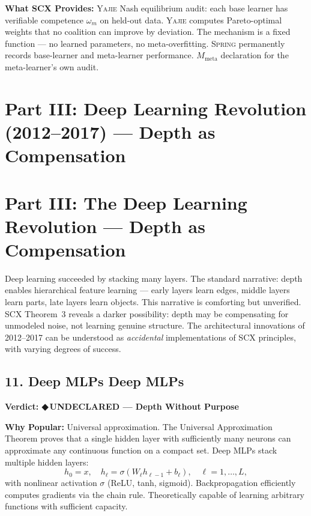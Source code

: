 \documentclass[12pt,a4paper]{article}
\theoremstyle{definition}
\newcommand{\guilty}{{\color{guiltycolor}\textbf{◆\,UNDECLARED}}}
\newcommand{\Yajie}{\textsc{Yajie}}
\newcommand{\Spring}{\textsc{Spring}}
\newcommand{\SCX}{\textsc{SCX}}
\newcommand{\auditHeader}[1]{\medskip\noindent\textbf{\large #1}\medskip}
\newcommand{\whyPopular}{\noindent\textbf{Why Popular:} }
\newcommand{\whatMissing}{\noindent\textbf{What SCX Provides:} }
\begin{document}
\whatMissing{} \Yajie{} Nash equilibrium audit: each base learner has verifiable competence $\omega_m$ on held-out data. \Yajie{} computes Pareto-optimal weights that no coalition can improve by deviation. The mechanism is a fixed function — no learned parameters, no meta-overfitting. \Spring{} permanently records base-learner and meta-learner performance. $M_{\text{meta}}$ declaration for the meta-learner's own audit.

\section{Part III: Deep Learning Revolution (2012--2017) — Depth as Compensation}
\section{Part III: The Deep Learning Revolution --- Depth as Compensation}
\label{sec:deep}

Deep learning succeeded by stacking many layers. The standard narrative: depth enables hierarchical feature learning — early layers learn edges, middle layers learn parts, late layers learn objects. This narrative is comforting but unverified. \SCX{} Theorem~3 reveals a darker possibility: depth may be compensating for unmodeled noise, not learning genuine structure. The architectural innovations of 2012--2017 can be understood as \textit{accidental} implementations of \SCX{} principles, with varying degrees of success.

\subsection{11. Deep MLPs Deep MLPs}

\auditHeader{Verdict: \guilty{} — Depth Without Purpose}

\whyPopular{} Universal approximation. The Universal Approximation Theorem proves that a single hidden layer with sufficiently many neurons can approximate any continuous function on a compact set. Deep MLPs stack multiple hidden layers:
\[
h_0 = x, \quad h_\ell = \sigma(W_\ell h_{\ell-1} + b_\ell), \quad \ell = 1, \ldots, L,
\]
with nonlinear activation $\sigma$ (ReLU, tanh, sigmoid). Backpropagation efficiently computes gradients via the chain rule. Theoretically capable of learning arbitrary functions with sufficient capacity.
\end{document}
